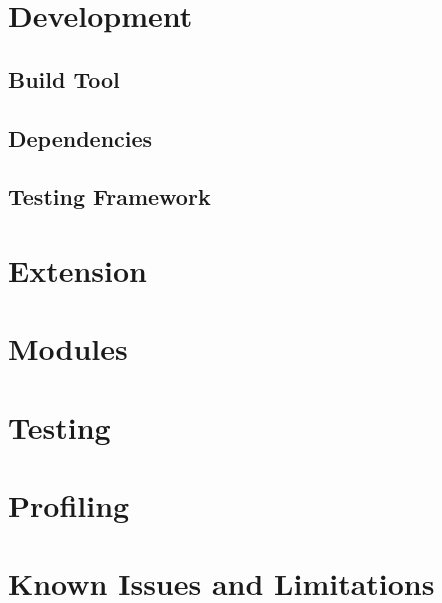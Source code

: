 \documentclass[11pt]{article}
\begin{document}
\section{Development}

\subsection{Build Tool}


\subsection{Dependencies}


\subsection{Testing Framework}


\section{Extension}


\section{Modules}


\section{Testing}


\section{Profiling}


\section{Known Issues and Limitations}

\end{document}
